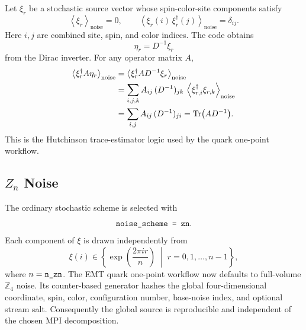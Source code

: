 \documentclass[11pt,a4paper]{article}
\newcommand{\code}[1]{\texttt{\begingroup\def\_{\textunderscore\allowbreak}#1\endgroup}}
\begin{document}
Let \(\xi_r\) be a stochastic source vector whose spin-color-site components
satisfy
\begin{equation}
  \left\langle \xi_r \right\rangle_{\mathrm{noise}} = 0,
  \qquad
  \left\langle
    \xi_r(i)\,\xi_r^\dagger(j)
  \right\rangle_{\mathrm{noise}} = \delta_{ij}.
  \label{eq:noise_identity}
\end{equation}
Here \(i,j\) are combined site, spin, and color indices.  The code obtains
\begin{equation}
  \eta_r = D^{-1}\xi_r
  \label{eq:eta_def}
\end{equation}
from the Dirac inverter.  For any operator matrix \(A\),
\begin{align}
  \left\langle
    \xi_r^\dagger A\eta_r
  \right\rangle_{\mathrm{noise}}
  &=
  \left\langle
    \xi_r^\dagger A D^{-1}\xi_r
  \right\rangle_{\mathrm{noise}}  \\
  &=
  \sum_{i,j,k}
  A_{ij}\,(D^{-1})_{jk}\,
  \left\langle
    \xi^\dagger_{r,i} \xi_{r,k}
  \right\rangle_{\mathrm{noise}} \\
  &=
  \sum_{i,j} A_{ij}\,(D^{-1})_{ji}
  =
  \Tr(A D^{-1}).
  \label{eq:stoch_trace_derivation}
\end{align}
This is the Hutchinson trace-estimator logic used by the quark one-point
workflow.

\subsection{\texorpdfstring{\(Z_n\)}{Zn} Noise}

The ordinary stochastic scheme is selected with
\begin{equation}
  \code{noise\_scheme = zn}.
\end{equation}
Each component of \(\xi\) is drawn independently from
\begin{equation}
  \xi(i) \in
  \left\{
  \exp\!\left(\frac{2\pi i r}{n}\right)
  \;\middle|\;
  r = 0,1,\ldots,n-1
  \right\},
  \label{eq:zn_noise}
\end{equation}
where \(n=\code{n\_zn}\).  The EMT quark one-point workflow now defaults to
full-volume \(\mathbb{Z}_4\) noise.  Its counter-based generator hashes the
global four-dimensional coordinate, spin, color, configuration number,
base-noise index, and optional stream salt.  Consequently the global source is
reproducible and independent of the chosen MPI decomposition.
\end{document}
